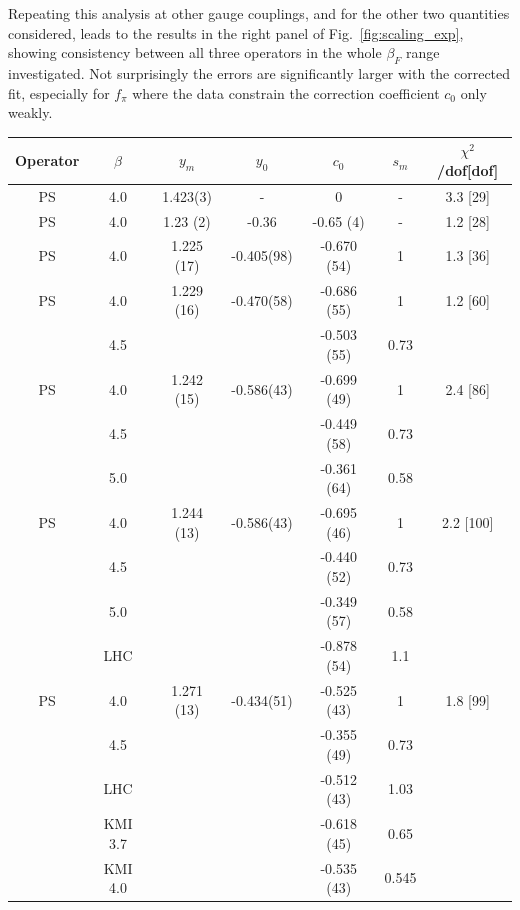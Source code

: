\documentclass[aps,prl,twocolumn,]{revtex4}  %
\newcommand{\fig}[1]{Fig.~\ref{#1}}
\begin{document}
Repeating this analysis at other gauge couplings, and for the other two quantities considered, leads to the results in the right panel of \fig{fig:scaling_exp}, showing consistency between all three operators in the whole $\beta_F$ range investigated.
Not surprisingly the errors are significantly larger with the corrected fit, especially for $f_\pi$ where the data constrain the correction coefficient $c_0$ only weakly.
\begin{table}[htdp]
\begin{center}
\begin{tabular}{|c|c|c|c|c|c|c|}
\hline
Operator & $\beta$ & $y_m$ & $y_0$ & $c_0$ &  $ s_m $  & $\chi^2$/dof[dof]   \\
\hline\hline
PS	&	4.0	& 	1.423(3)	&	 - 		    &	0	        &	-	    	&	3.3 [29]	\\
\hline
PS	&	4.0	&	1.23 (2)	&	-0.36	    &	-0.65 (4)	&	-	    	&	1.2 [28] \\
\hline
PS	&	4.0	& 	1.225 (17)	&	 -0.405(98) &	-0.670 (54)	&	1	    &   1.3 [36] \\
\hline
PS	&	4.0	& 	1.229 (16)	&	 -0.470(58) &	-0.686 (55)	&	1	    &   1.2 [60] \\
	&	4.5	&		        &			    &	-0.503 (55)	&	0.73   &	 	        \\
\hline
PS	&	4.0	& 	1.242 (15)	&	  -0.586(43) &	-0.699 (49)	&	1	    &   2.4 [86] \\
	&	4.5	&		        &			    &	-0.449 (58)	&	0.73   &	 	        \\
	&	5.0	&	        	&       		&	-0.361 (64)	&	0.58	&		        \\
\hline
PS	&	4.0	& 	1.244 (13)	&	  -0.586(43) &	-0.695 (46)	&	1	    &   2.2 [100] \\
	&	4.5	&		        &			    &	-0.440 (52)	&	0.73   &	 	        \\
	&	5.0	&	        	&       		&	-0.349 (57)	&	0.58	&		        \\
	&	LHC\protect\cite{Fodor:2011tu}	&	&		&	-0.878 (54)&	1.1	& 	 \\
\hline
PS	&	4.0	& 	1.271 (13)	&	   -0.434(51) &	-0.525 (43)	&	1	    &   1.8 [99] \\
	&	4.5	&		        &			    &	-0.355 (49)	&	0.73   &	 	        \\
	&	LHC\protect\cite{Fodor:2011tu}	&&	&	-0.512 (43) &	1.03 	& 	 \\
	&	KMI 3.7\protect\cite{Aoki:2012eq}&& &	-0.618 (45)	&	0.65 &	 	 \\
	&	KMI 4.0\protect\cite{Aoki:2012eq}&&	&	-0.535 (43)	&	0.545 &	\\

\end{tabular}
\end{center}
\end{table}
\end{document}
